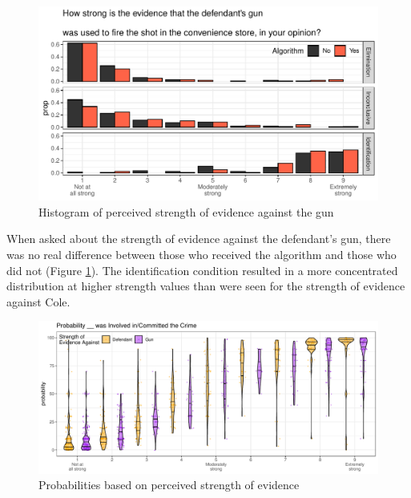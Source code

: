 \documentclass[print]{nuthesis}
\begin{document}
\begin{figure}

{\centering \includegraphics[width=\linewidth]{thesis_files/figure-latex/gunstrength-1} 

}

\caption{Histogram of perceived strength of evidence against the gun}\label{fig:gunstrength}
\end{figure}

When asked about the strength of evidence against the defendant's gun, there was no real difference between those who received the algorithm and those who did not (Figure \ref{fig:gunstrength}).
The identification condition resulted in a more concentrated distribution at higher strength values than were seen for the strength of evidence against Cole.

\begin{figure}

{\centering \includegraphics[width=\linewidth]{thesis_files/figure-latex/probstrength-1} 

}

\caption{Probabilities based on perceived strength of evidence}\label{fig:probstrength}
\end{figure}
\end{document}
